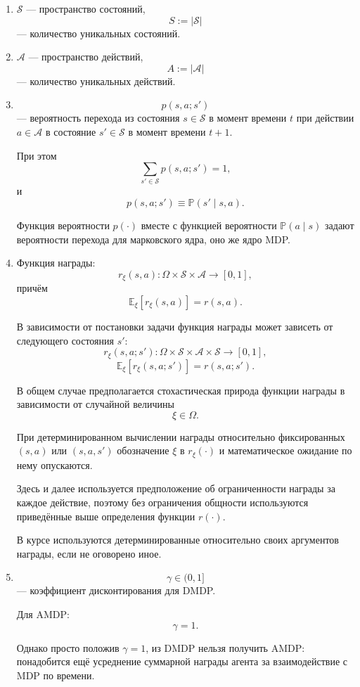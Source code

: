\documentclass[12pt,a4paper]{article}
\begin{document}
\begin{enumerate}
    \item $\mathcal S$ --- пространство состояний,
    \[
    S := |\mathcal S|
    \]
    --- количество уникальных состояний.

    \item $\mathcal A$ --- пространство действий,
    \[
    A := |\mathcal A|
    \]
    --- количество уникальных действий.

    \item
    \[
    p(s,a;s')
    \]
    --- вероятность перехода из состояния $s \in \mathcal S$ в момент времени $t$ при действии $a \in \mathcal A$ в состояние $s' \in \mathcal S$ в момент времени $t+1$.

    При этом
    \[
    \sum_{s' \in \mathcal S} p(s,a;s') = 1,
    \]
    и
    \[
    p(s,a;s') \equiv \mathbb P(s' \mid s,a).
    \]

    Функция вероятности $p(\cdot)$ вместе с функцией вероятности $\mathbb P(a \mid s)$ задают вероятности перехода для марковского ядра, оно же ядро MDP.

    \item Функция награды:
    \[
    r_\xi(s,a) : \Omega \times \mathcal S \times \mathcal A \to [0,1],
    \]
    причём
    \[
    \mathbb E_\xi \left[ r_\xi(s,a) \right] = r(s,a).
    \]

    В зависимости от постановки задачи функция награды может зависеть от следующего состояния $s'$:
    \[
    r_\xi(s,a;s') : \Omega \times \mathcal S \times \mathcal A \times \mathcal S \to [0,1],
    \]
    \[
    \mathbb E_\xi \left[ r_\xi(s,a;s') \right] = r(s,a;s').
    \]

    В общем случае предполагается стохастическая природа функции награды в зависимости от случайной величины
    \[
    \xi \in \Omega.
    \]

    При детерминированном вычислении награды относительно фиксированных $(s,a)$ или $(s,a,s')$ обозначение $\xi$ в $r_\xi(\cdot)$ и математическое ожидание по нему опускаются.

    Здесь и далее используется предположение об ограниченности награды за каждое действие, поэтому без ограничения общности используются приведённые выше определения функции $r(\cdot)$.

    В курсе используются детерминированные относительно своих аргументов награды, если не оговорено иное.

    \item
    \[
    \gamma \in (0,1]
    \]
    --- коэффициент дисконтирования для DMDP.

    Для AMDP:
    \[
    \gamma = 1.
    \]

    Однако просто положив $\gamma = 1$, из DMDP нельзя получить AMDP: понадобится ещё усреднение суммарной награды агента за взаимодействие с MDP по времени.
\end{enumerate}
\end{document}
